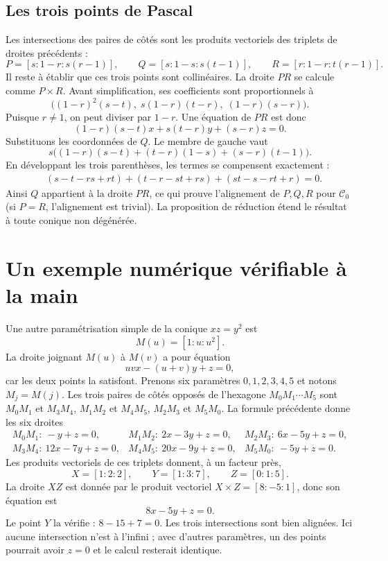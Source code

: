 \subsection{Les trois points de Pascal}
Les intersections des paires de côtés sont les produits vectoriels des triplets de droites précédents :
\[
 P=[s:1-r:s(r-1)],\qquad
 Q=[s:1-s:s(t-1)],\qquad
 R=[r:1-r:t(r-1)].
\]
Il reste à établir que ces trois points sont collinéaires. La droite $PR$ se calcule comme $P\times R$. Avant simplification, ses coefficients sont proportionnels à
\[
 \bigl((1-r)^2(s-t),\;s(1-r)(t-r),\;(1-r)(s-r)\bigr).
\]
Puisque $r\ne1$, on peut diviser par $1-r$. Une équation de $PR$ est donc
\begin{equation}\label{eq:pascal-line}
 (1-r)(s-t)x+s(t-r)y+(s-r)z=0.
\end{equation}
Substituons les coordonnées de $Q$. Le membre de gauche vaut
\[
 s\bigl((1-r)(s-t)+(t-r)(1-s)+(s-r)(t-1)\bigr).
\]
En développant les trois parenthèses, les termes se compensent exactement :
\begin{align*}
 &(s-t-rs+rt)+(t-r-st+rs)+(st-s-rt+r)=0.
\end{align*}
Ainsi $Q$ appartient à la droite $PR$, ce qui prouve l'alignement de $P,Q,R$ pour $\mathcal C_0$ (si $P=R$, l'alignement est trivial). La proposition de réduction étend le résultat à toute conique non dégénérée.\finpreuve


\section{Un exemple numérique vérifiable à la main}
Une autre paramétrisation simple de la conique $xz=y^2$ est
\[
 M(u)=[1:u:u^2].
\]
La droite joignant $M(u)$ à $M(v)$ a pour équation
\[
 uvx-(u+v)y+z=0,
\]
car les deux points la satisfont. Prenons six paramètres $0,1,2,3,4,5$ et notons $M_j=M(j)$. Les trois paires de côtés opposés de l'hexagone $M_0M_1\cdots M_5$ sont $M_0M_1$ et $M_3M_4$, $M_1M_2$ et $M_4M_5$, $M_2M_3$ et $M_5M_0$. La formule précédente donne les six droites
\[
 \begin{array}{lll}
 M_0M_1:\ -y+z=0, & M_1M_2:\ 2x-3y+z=0, & M_2M_3:\ 6x-5y+z=0,\\
 M_3M_4:\ 12x-7y+z=0, & M_4M_5:\ 20x-9y+z=0, & M_5M_0:\ -5y+z=0.
 \end{array}
\]
Les produits vectoriels de ces triplets donnent, à un facteur près,
\[
 X=[1:2:2],\qquad Y=[1:3:7],\qquad Z=[0:1:5].
\]
La droite $XZ$ est donnée par le produit vectoriel $X\times Z=[8:-5:1]$, donc son équation est
\[
 8x-5y+z=0.
\]
Le point $Y$ la vérifie : $8-15+7=0$. Les trois intersections sont bien alignées. Ici aucune intersection n'est à l'infini ; avec d'autres paramètres, un des points pourrait avoir $z=0$ et le calcul resterait identique.

